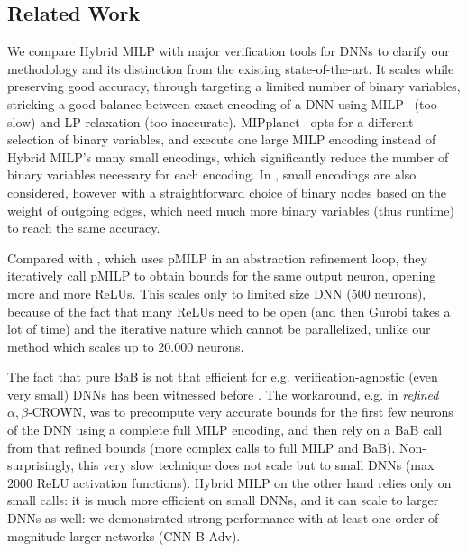 \subsection{Related Work} 

We compare Hybrid MILP with major verification tools for DNNs to clarify our methodology and its distinction from the existing state-of-the-art. It scales while preserving good accuracy, through targeting a limited number of binary variables, stricking a good balance between exact encoding of a DNN using MILP~\cite{MILP} (too slow) and LP relaxation (too inaccurate). MIPplanet~\cite{MIPplanet} opts for a different selection of binary variables, and execute one large MILP encoding instead of Hybrid MILP's many small encodings, which significantly reduce the number of binary variables necessary for each encoding. In \cite{DivideAndSlide}, small encodings are also considered, however with a straightforward choice of binary nodes based on the weight of outgoing edges, which need much more {binary variables} (thus runtime) to reach the same accuracy.

Compared with \cite{atva}, which uses pMILP in an abstraction refinement loop, 
they iteratively call pMILP to obtain bounds for the same output neuron, opening more and more ReLUs. This scales only to limited size DNN (500 neurons), because of the fact that many ReLUs need to be open (and then Gurobi takes a lot of time) and the iterative nature which cannot be parallelized, unlike our method which scales up to 20.000 neurons.


The fact that pure BaB is not that efficient for e.g. verification-agnostic (even very small) DNNs has been witnessed before \cite{MILP2}. The workaround, e.g. in {\em refined} $\alpha,\beta$-CROWN, was to precompute very accurate bounds for the first few neurons of the DNN using a complete full MILP encoding, and then rely on a BaB call from that refined bounds (more complex calls to full MILP and BaB). Non-surprisingly, this very slow technique does not scale but to small DNNs (max 2000 ReLU activation functions). Hybrid MILP on the other hand relies only on small calls: it is much more efficient on small DNNs, and it can scale to larger DNNs as well: we demonstrated strong performance with at least one order of magnitude larger networks (CNN-B-Adv).

